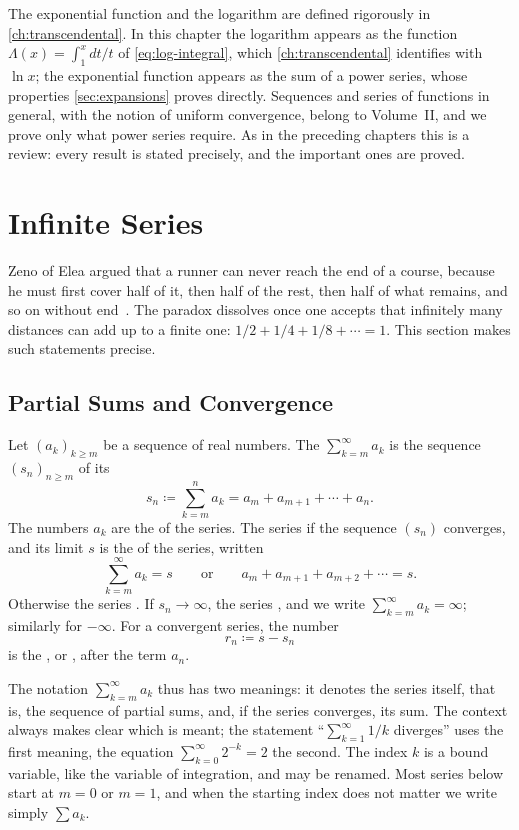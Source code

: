 The exponential function and the logarithm are defined rigorously in \cref{ch:transcendental}. In this chapter the logarithm appears as the function $\Lambda(x)=\int_1^xdt/t$ of \eqref{eq:log-integral}, which \cref{ch:transcendental} identifies with $\ln x$; the exponential function appears as the sum of a power series, whose properties \cref{sec:expansions} proves directly. Sequences and series of functions in general, with the notion of uniform convergence, belong to Volume~II, and we prove only what power series require. As in the preceding chapters this is a review: every result is stated precisely, and the important ones are proved.

\section{Infinite Series}
\label{sec:series}

Zeno of Elea argued that a runner can never reach the end of a course, because he must first cover half of it, then half of the rest, then half of what remains, and so on without end~\cite{boyer1959}. The paradox dissolves once one accepts that infinitely many distances can add up to a finite one: $1/2+1/4+1/8+\cdots=1$. This section makes such statements precise.

\subsection{Partial Sums and Convergence}

\begin{definition}[Series]
\label{def:series}
Let $(a_k)_{k\ge m}$ be a sequence of real numbers. The  $\sum_{k=m}^\infty a_k$ is the sequence $(s_n)_{n\ge m}$ of its 
\[
s_n\coloneqq\sum_{k=m}^na_k=a_m+a_{m+1}+\cdots+a_n .
\]
The numbers $a_k$ are the  of the series. The series  if the sequence $(s_n)$ converges, and its limit $s$ is the  of the series, written
\[
\sum_{k=m}^\infty a_k=s\qquad\text{or}\qquad a_m+a_{m+1}+a_{m+2}+\cdots=s .
\]
Otherwise the series . If $s_n\to\infty$, the series , and we write $\sum_{k=m}^\infty a_k=\infty$; similarly for $-\infty$. For a convergent series, the number
\[
r_n\coloneqq s-s_n
\]
is the , or , after the term $a_n$.
\end{definition}

The notation $\sum_{k=m}^\infty a_k$ thus has two meanings: it denotes the series itself, that is, the sequence of partial sums, and, if the series converges, its sum. The context always makes clear which is meant; the statement ``$\sum_{k=1}^\infty1/k$ diverges'' uses the first meaning, the equation $\sum_{k=0}^\infty2^{-k}=2$ the second. The index $k$ is a bound variable, like the variable of integration, and may be renamed. Most series below start at $m=0$ or $m=1$, and when the starting index does not matter we write simply $\sum a_k$.

